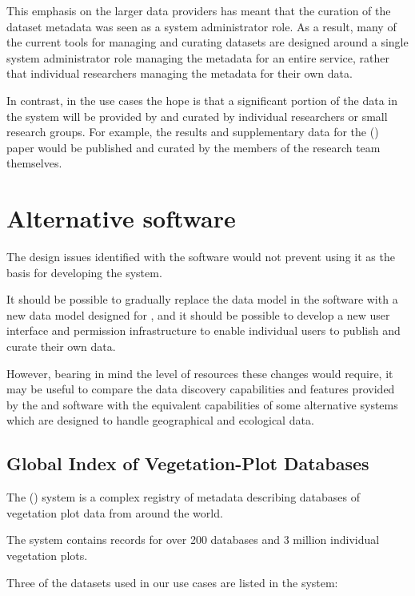 \documentclass{article}
\begin{document}
This emphasis on the larger data providers has meant that the curation of the
dataset metadata was seen as a system administrator role. As a result, many
of the current tools for managing and curating datasets are designed around a
single system administrator role managing the metadata for an entire service,
rather that individual researchers managing the metadata for their own data.

In contrast, in the \cite{trop} use cases the hope is that a significant
portion of the data in the system will be provided by and curated by
individual researchers or small research groups.
For example, the results and supplementary data for the (\cite{mitchard-2014})
paper would be published and curated by the members of the research team
themselves.

\section{Alternative software}

The design issues identified with the \cite{ivoa} software would not prevent
using it as the basis for developing the \cite{trop} system.

It should be possible to gradually replace the \cite{ivoa-obscore} data model
in the \cite{ivoa} software with a new data model designed for \cite{trop},
and it should be possible to develop a new user interface and permission
infrastructure to enable individual users to publish and curate their
own data.

However, bearing in mind the level of resources these changes would require,
it may be useful to compare the data discovery capabilities and features
provided by the \cite{ivoa} and \cite{astro} software with the equivalent
capabilities of some alternative systems which are designed to handle
geographical and ecological data.

\subsection{Global Index of Vegetation-Plot Databases}

The  (\cite{givd}) system is a complex registry of metadata
describing databases of vegetation plot data from around the world.

The \cite{givd} system contains records for over 200 databases and 3 million
individual vegetation plots.

Three of the datasets used in our use cases are listed in the \cite{givd}
system:
\end{document}

